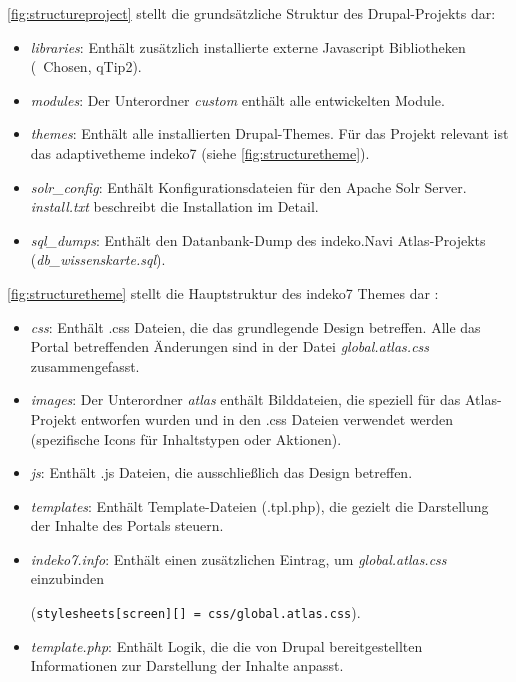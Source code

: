 \cref{fig:structureproject} stellt die grundsätzliche Struktur des Drupal-Projekts dar:
\begin{itemize}
	\item \textit{libraries}: Enthält zusätzlich installierte externe Javascript Bibliotheken (\zB\ Chosen, qTip2).

	\item \textit{modules}: Der Unterordner \textit{custom} enthält alle entwickelten Module.

	\item \textit{themes}: Enthält alle installierten Drupal-Themes. Für das Projekt relevant ist das adaptivetheme indeko7 (siehe \cref{fig:structuretheme}).

	\item \textit{solr\_config}: Enthält Konfigurationsdateien für den Apache Solr Server. \textit{install.txt} beschreibt die Installation im Detail.

	\item \textit{sql\_dumps}: Enthält den Datanbank-Dump des \acrshort{indeko}.Navi Atlas-Projekts  (\textit{db\_wissenskarte.sql}).
\end{itemize}



\cref{fig:structuretheme} stellt die Hauptstruktur des indeko7 Themes dar :
\begin{itemize}
	\item \textit{css}: Enthält .css Dateien, die das grundlegende Design betreffen. Alle das Portal betreffenden Änderungen sind in der Datei \textit{global.atlas.css} zusammengefasst.

	\item \textit{images}: Der Unterordner \textit{atlas} enthält Bilddateien, die speziell für das Atlas-Projekt entworfen wurden und in den .css Dateien verwendet werden (\zB spezifische Icons für Inhaltstypen oder Aktionen).

	\item \textit{js}: Enthält .js Dateien, die ausschließlich das Design betreffen.

	\item \textit{templates}: Enthält Template-Dateien (.tpl.php), die gezielt die Darstellung der Inhalte des Portals steuern.

	\item \textit{indeko7.info}: Enthält einen zusätzlichen Eintrag, um \textit{global.atlas.css} einzubinden

	(\lstinline|stylesheets[screen][] = css/global.atlas.css|).

	\item \textit{template.php}: Enthält Logik, die die von Drupal bereitgestellten Informationen zur Darstellung der Inhalte anpasst.

\end{itemize}



